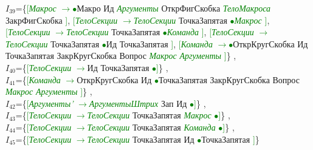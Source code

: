 \documentclass[a0]{a0poster}
\begin{document}
$I_{39}$=\{\textcolor{Green}{[}\textcolor{Green}{\textit{Макрос}} \textcolor{Green}{$\to$}\textcolor{Green}{$\bullet$}Макро Ид \textcolor{Green}{\textit{Аргументы}} ОткрФигСкобка \textcolor{Green}{\textit{ТелоМакроса}} ЗакрФигСкобка \textcolor{Green}{]}, \textcolor{Green}{[}\textcolor{Green}{\textit{ТелоСекции}} \textcolor{Green}{$\to$}\textcolor{Green}{\textit{ТелоСекции}} ТочкаЗапятая \textcolor{Green}{$\bullet$}\textcolor{Green}{\textit{Макрос}} \textcolor{Green}{]}, \textcolor{Green}{[}\textcolor{Green}{\textit{ТелоСекции}} \textcolor{Green}{$\to$}\textcolor{Green}{\textit{ТелоСекции}} ТочкаЗапятая \textcolor{Green}{$\bullet$}\textcolor{Green}{\textit{Команда}} \textcolor{Green}{]}, \textcolor{Green}{[}\textcolor{Green}{\textit{ТелоСекции}} \textcolor{Green}{$\to$}\textcolor{Green}{\textit{ТелоСекции}} ТочкаЗапятая \textcolor{Green}{$\bullet$}Ид ТочкаЗапятая \textcolor{Green}{]}, \textcolor{Green}{[}\textcolor{Green}{\textit{Команда}} \textcolor{Green}{$\to$}\textcolor{Green}{$\bullet$}ОткрКругСкобка Ид ТочкаЗапятая ЗакрКругСкобка Вопрос \textcolor{Green}{\textit{Макрос}} \textcolor{Green}{\textit{Аргументы}} \textcolor{Green}{]}\}
,\\
$I_{40}$=\{\textcolor{Green}{[}\textcolor{Green}{\textit{ТелоСекции}} \textcolor{Green}{$\to$}Ид ТочкаЗапятая \textcolor{Green}{$\bullet$}\textcolor{Green}{]}\}
,\\
$I_{41}$=\{\textcolor{Green}{[}\textcolor{Green}{\textit{Команда}} \textcolor{Green}{$\to$}ОткрКругСкобка Ид \textcolor{Green}{$\bullet$}ТочкаЗапятая ЗакрКругСкобка Вопрос \textcolor{Green}{\textit{Макрос}} \textcolor{Green}{\textit{Аргументы}} \textcolor{Green}{]}\}
,\\
$I_{42}$=\{\textcolor{Green}{[}\textcolor{Green}{\textit{Аргументы'}} \textcolor{Green}{$\to$}\textcolor{Green}{\textit{АргументыШтрих}} Зап Ид \textcolor{Green}{$\bullet$}\textcolor{Green}{]}\}
,\\
$I_{43}$=\{\textcolor{Green}{[}\textcolor{Green}{\textit{ТелоСекции}} \textcolor{Green}{$\to$}\textcolor{Green}{\textit{ТелоСекции}} ТочкаЗапятая \textcolor{Green}{\textit{Макрос}} \textcolor{Green}{$\bullet$}\textcolor{Green}{]}\}
,\\
$I_{44}$=\{\textcolor{Green}{[}\textcolor{Green}{\textit{ТелоСекции}} \textcolor{Green}{$\to$}\textcolor{Green}{\textit{ТелоСекции}} ТочкаЗапятая \textcolor{Green}{\textit{Команда}} \textcolor{Green}{$\bullet$}\textcolor{Green}{]}\}
,\\
$I_{45}$=\{\textcolor{Green}{[}\textcolor{Green}{\textit{ТелоСекции}} \textcolor{Green}{$\to$}\textcolor{Green}{\textit{ТелоСекции}} ТочкаЗапятая Ид \textcolor{Green}{$\bullet$}ТочкаЗапятая \textcolor{Green}{]}\}
\end{document}
